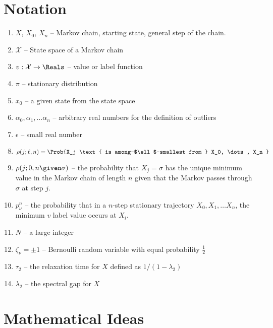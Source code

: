 \documentclass[12pt]{article}
\begin{document}
\section*{Notation}
\begin{enumerate}
    \item
        \( X \), \( X_0 \), \( X_n \) -- Markov chain, starting state,
        general step of the chain.
  \item \( \mathcal{X} \) -- State space of a Markov chain
  \item \( v :  \mathcal{X} \to \Reals \) -- value or label function
  \item \( \pi \) -- stationary distribution
  \item \( x_0 \) -- a given state from the state space
  \item \( \alpha_0, \alpha_1, \dots \alpha_n \) -- arbitrary real
    numbers for the definition of outliers
  \item \( \epsilon \) -- small real number
  \item \[
              \rho(j; \ell, n) = \Prob{X_j \text{ is
                  among-$\ell$-smallest from } X_0, \dots, X_n }
            \]
  \item   \( \rho(j; 0, n \given \sigma)
            \) -- the probability that \( X_j = \sigma \) has the unique
            minimum value in the Markov chain of length \( n \) given
            that the Markov passes through \( \sigma \) at step \( j
            \).
  \item \( p_{\nu}^n \) -- the
probability that in a \( n \)-step stationary trajectory \( X_0, X_1,
\dots X_n \), the minimum \( v \) label value occurs at \( X_i \).
\item \( N \) -- a large integer
\item \( \zeta_{\nu} = \pm 1 \)  --  Bernoulli random variable with
equal probability \( \frac{1}{2} \)
\item   \( \tau_2 \) -- the relaxation time
  for \( X \) defined as \( 1/ (1-\lambda_2) \) 
\item  \( \lambda_2 \) --  the spectral gap for \( X \)
\end{enumerate}

\section*{Mathematical Ideas}
\end{document}
